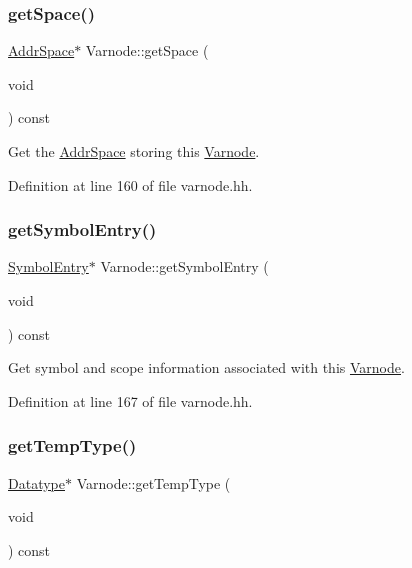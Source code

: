 \subsubsection{\texorpdfstring{getSpace()}{getSpace()}}
{\footnotesize\ttfamily \mbox{\hyperlink{class_addr_space}{Addr\+Space}}$\ast$ Varnode\+::get\+Space (\begin{DoxyParamCaption}\item[{void}]{ }\end{DoxyParamCaption}) const\hspace{0.3cm}{\ttfamily [inline]}}



Get the \mbox{\hyperlink{class_addr_space}{Addr\+Space}} storing this \mbox{\hyperlink{class_varnode}{Varnode}}. 



Definition at line 160 of file varnode.\+hh.

\mbox{\label{class_varnode_a47ebcd6a380ad9322fbfbf083650b8f8}} 
\subsubsection{\texorpdfstring{getSymbolEntry()}{getSymbolEntry()}}
{\footnotesize\ttfamily \mbox{\hyperlink{class_symbol_entry}{Symbol\+Entry}}$\ast$ Varnode\+::get\+Symbol\+Entry (\begin{DoxyParamCaption}\item[{void}]{ }\end{DoxyParamCaption}) const\hspace{0.3cm}{\ttfamily [inline]}}



Get symbol and scope information associated with this \mbox{\hyperlink{class_varnode}{Varnode}}. 



Definition at line 167 of file varnode.\+hh.

\mbox{\label{class_varnode_aadb6aff446d9948f49b204d2dc668261}} 
\subsubsection{\texorpdfstring{getTempType()}{getTempType()}}
{\footnotesize\ttfamily \mbox{\hyperlink{class_datatype}{Datatype}}$\ast$ Varnode\+::get\+Temp\+Type (\begin{DoxyParamCaption}\item[{void}]{ }\end{DoxyParamCaption}) const\hspace{0.3cm}{\ttfamily [inline]}}




